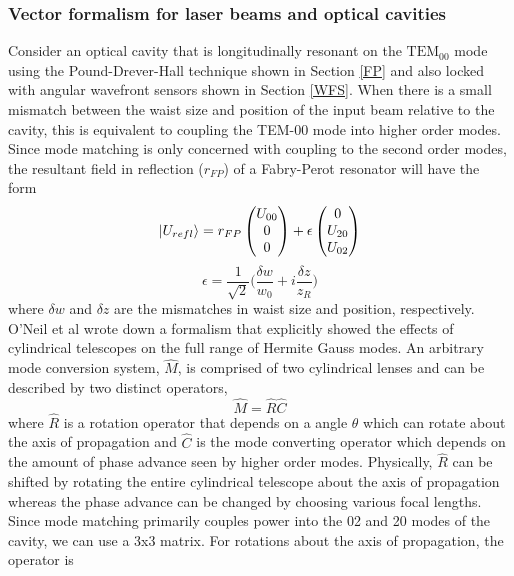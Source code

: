 \subsubsection{Vector formalism for laser beams and optical cavities}
	Consider an optical cavity that is longitudinally resonant on the $\text{TEM}_{00}$ mode using the Pound-Drever-Hall technique shown in Section \ref{FP} and also locked with angular wavefront sensors shown in Section \ref{WFS}. When there is a small mismatch between the waist size and position of the input beam relative to the cavity, this is equivalent to coupling the TEM-00 mode into higher order modes.  Since mode matching is only concerned with coupling to the second order modes, the  resultant field in reflection ($r_{FP}$) of a Fabry-Perot resonator will have the form
	\begin{equation}\label{MMVector}
	\ket{U_{refl}} = r_{FP} \begin{pmatrix} U_{00}
	\\ 0
	\\ 0
	\end{pmatrix}
		+
	\epsilon \begin{pmatrix} 0
	\\ U_{20}
	\\ U_{02}
	\end{pmatrix}
	\end{equation}
\begin{equation}
\epsilon = \frac{1}{\sqrt{2}} \bigg(\frac{\delta w}{w_0} + i \frac{\delta z}{z_R}\bigg)
\end{equation}
where $\delta w$ and $\delta z$ are the mismatches in waist size and position, respectively.  O'Neil et al \cite{ONeilModeTransform} wrote down a formalism that explicitly showed the effects of cylindrical telescopes on the full range of Hermite Gauss modes. An arbitrary mode conversion system, $\hat{M}$, is comprised of two cylindrical lenses and can be described by two distinct operators,
	\begin{equation}
	\hat{M} = \hat{R} \hat{C}
	\end{equation} 
where $\hat{R}$ is a rotation operator that depends on a angle $\theta$ which can rotate about the axis of propagation and $\hat{C}$ is the mode converting operator which depends on the amount of phase advance seen by higher order modes.  Physically, $\hat{R}$ can be shifted by rotating the entire cylindrical telescope about the axis of propagation whereas the phase advance can be changed by choosing various focal lengths.  Since mode matching primarily couples power into the 02 and 20 modes of the cavity, we can use a 3x3 matrix.  For rotations about the axis of propagation, the operator is
